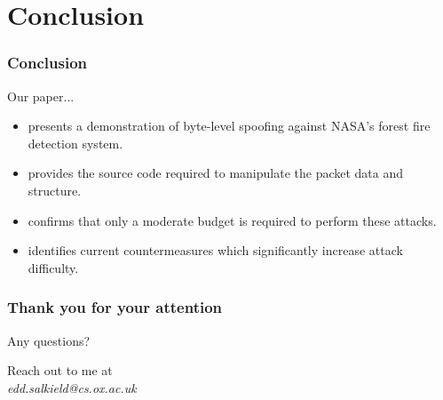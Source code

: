 \documentclass{beamer}
\begin{document}
\section{Conclusion}

\begin{frame}
  \frametitle{Conclusion}

  Our paper...
  \pause
  \begin{itemize}[<+->]
    \item presents a demonstration of byte-level spoofing against NASA's forest fire detection system.
    \item provides the source code required to manipulate the packet data and structure.
    \item confirms that only a moderate budget is required to perform these attacks.
    \item identifies current countermeasures which significantly increase attack difficulty.
  \end{itemize}
\end{frame}

\begin{frame}
  \frametitle{Thank you for your attention}

  \begin{center}
    \Large
    Any questions?
  \end{center}
  \vspace{1cm}

  \begin{center}
    Reach out to me at \\
    \textit{edd.salkield@cs.ox.ac.uk}
  \end{center}
\end{frame}
\end{document}
